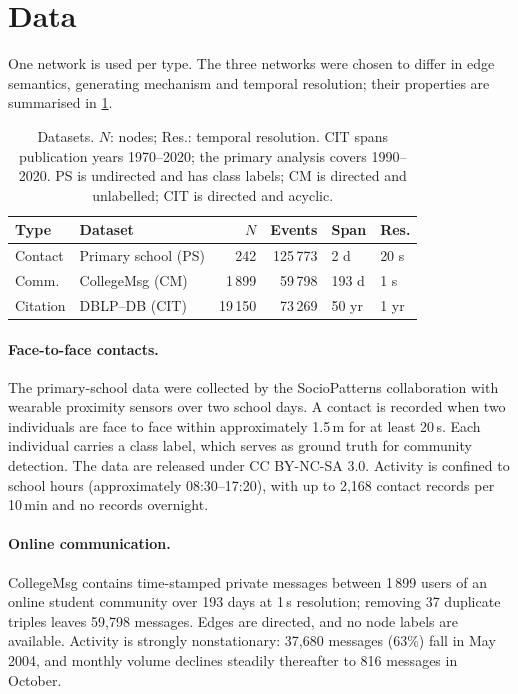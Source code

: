\section{Data}
\label{sec:data}
One network is used per type. The three networks were chosen to differ in edge semantics,
generating mechanism and temporal resolution; their properties are summarised in
\cref{tab:data}.

\begin{table}[t]
\centering
\small
\setlength{\tabcolsep}{3pt}
\begin{tabular*}{\columnwidth}{@{\extracolsep{\fill}}llrrll@{}}
\toprule
Type & Dataset & $N$ & Events & Span & Res. \\
\midrule
Contact & Primary school (PS) & 242 & 125\,773 & 2 d & 20 s \\
Comm. & CollegeMsg (CM) & 1\,899 & 59\,798 & 193 d & 1 s \\
Citation & DBLP--DB (CIT) & 19\,150 & 73\,269 & 50 yr & 1 yr \\
\bottomrule
\end{tabular*}
\caption{Datasets. $N$: nodes; Res.: temporal resolution. CIT spans publication years
1970--2020; the primary analysis covers 1990--2020. PS is undirected and has class labels;
CM is directed and unlabelled; CIT is directed and acyclic.}
\label{tab:data}
\end{table}

\paragraph{Face-to-face contacts.}
The primary-school data \citep{stehle2011high,gemmetto2014mitigation} were collected by
the SocioPatterns collaboration with wearable proximity sensors over two school days. A
contact is recorded when two individuals are face to face within approximately 1.5\,m for
at least 20\,s. Each individual carries a class label, which serves as ground truth for
community detection. The data are released under CC BY-NC-SA 3.0. Activity is confined to
school hours (approximately 08:30--17:20), with up to 2,168 contact records per 10\,min and
no records overnight.

\paragraph{Online communication.}
CollegeMsg \citep{panzarasa2009patterns} contains time-stamped private messages between
1\,899 users of an online student community over 193 days at 1\,s resolution; removing
37 duplicate triples leaves 59,798 messages. Edges are directed, and no node labels are
available. Activity is strongly nonstationary: 37,680 messages (63\%) fall in May 2004, and
monthly volume declines steadily thereafter to 816 messages in October.

